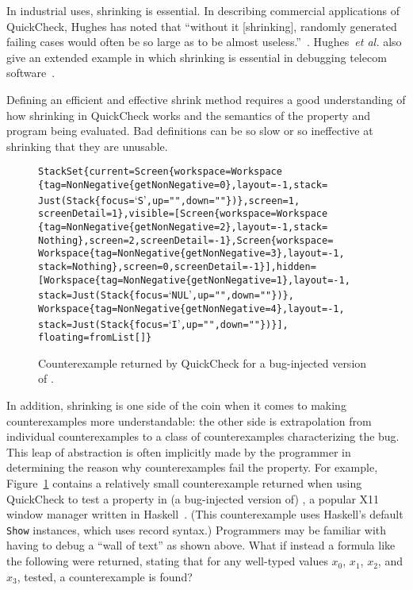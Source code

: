 \documentclass{sigplanconf}
\newenvironment{code}{\begin{alltt}\footnotesize}{\end{alltt}}
\newcommand{\ttp}[1]{\texttt{#1}}
\begin{document}
In industrial uses, shrinking is essential.  In describing commercial
applications of QuickCheck, Hughes has noted that ``without it [shrinking],
randomly generated failing cases would often be so large as to be almost
useless.''~\cite{qcjh}.  Hughes~\emph{et al.} also give an extended example in
which shrinking is essential in debugging telecom software~\cite{telecom}.

Defining an efficient and effective shrink method requires a good understanding
of how shrinking in QuickCheck works and the semantics of the property and
program being evaluated.  Bad definitions can be so slow or so ineffective at
shrinking that they are unusable.

\begin{figure}[ht]
\begin{code}
\scriptsize
StackSet \{current = Screen \{workspace = Workspace
\{tag = NonNegative \{getNonNegative = 0\}, layout = -1, stack =
Just (Stack \{focus = `S', up ="", down = ""\})\}, screen = 1,
screenDetail = 1\}, visible = [Screen \{workspace = Workspace
\{tag = NonNegative \{getNonNegative = 2\}, layout = -1, stack =
Nothing\}, screen = 2, screenDetail = -1\},Screen \{workspace =
Workspace \{tag = NonNegative \{getNonNegative = 3\}, layout = -1,
stack = Nothing\}, screen = 0, screenDetail = -1\}], hidden =
[Workspace \{tag = NonNegative \{getNonNegative = 1\}, layout = -1,
stack = Just (Stack \{focus = `NUL', up = "", down = ""\})\},
Workspace \{tag = NonNegative \{getNonNegative = 4\}, layout = -1,
stack = Just (Stack \{focus = `I', up = "", down = ""\})\}],
floating = fromList []\}
\end{code}
  \caption{Counterexample returned by QuickCheck for a bug-injected version of \xmonad.}
  \label{fig:xmonadex}
\end{figure}

In addition, shrinking is one side of the coin when it comes to making
counterexamples more understandable: the other side is extrapolation from
individual counterexamples to a class of counterexamples characterizing the bug.
This leap of abstraction is often implicitly made by the programmer in
determining the reason why counterexamples fail the property.  For example,
Figure~\ref{fig:xmonadex} contains a relatively small counterexample returned
when using QuickCheck to test a property in (a bug-injected version of) \xmonad,
a popular X11 window manager written in Haskell~\cite{xmonad}.  (This
counterexample uses Haskell's default \ttp{Show} instances, which uses record
syntax.)  Programmers may be familiar with having to debug a ``wall of text'' as
shown above.  What if instead a formula like the following were returned,
stating that for any well-typed values $x_0$, $x_1$, $x_2$, and $x_3$, tested, a
counterexample is found?
\end{document}
